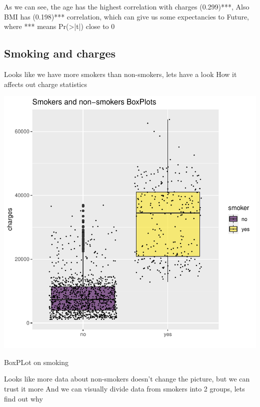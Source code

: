 \documentclass{article}
\begin{document}
As we can see, the  age has the highest correlation with charges (0.299)***,
Also BMI has (0.198)*** correlation, which can give us some expectancies to 
Future, where *** means Pr(>|t|) close to 0

\subsection{Smoking and charges}

Looks like we have more smokers than non-smokers, lets have a look
How it affects out charge statistics

\begin{centerfig}
\includegraphics{Untitled-044}
\caption{BoxPLot on smoking}
\end{centerfig}

Looks like more data about non-smokers doesn't change the picture, 
but we can trust it more
And we can visually divide data from smokers into 2 groups, lets find out 
why
\end{document}
